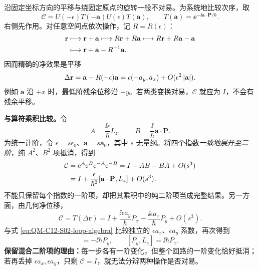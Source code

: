 

沿固定坐标方向的平移与绕固定原点的旋转一般不对易。为系统地比较次序，取
\begin{equation}
  \mathcal C=U(-\epsilon)T(-\mathbf a)U(\epsilon)T(\mathbf a),
  \qquad T(\mathbf a)=\ee^{-\ii\mathbf a\cdot\mathbf P/\hbar}.
\end{equation}
右侧先作用。对任意空间点依次操作，记 $R=R(\epsilon)$：
\begin{align}
  \mathbf r&\longmapsto\mathbf r+\mathbf a
  \longmapsto R\mathbf r+R\mathbf a
  \longmapsto R\mathbf r+R\mathbf a-\mathbf a\notag\\
  &\longmapsto\mathbf r+\mathbf a-R^{-1}\mathbf a.
\end{align}
因而精确的净效果是平移
\begin{equation}
  \Delta\mathbf r=\mathbf a-R(-\epsilon)\mathbf a
  =\epsilon(-a_y,a_x)+O(\epsilon^2\left|\mathbf a\right|).
  \label{eq:QM-C12-S02-loop-geometry}
\end{equation}
例如 $\mathbf a$ 沿 $+x$ 时，最低阶残余位移沿 $+y$。若两类变换对易，$\mathcal C$ 就应为 $I$，不会有残余平移。

\textbf{与算符乘积比较。}令
\begin{equation}
  A=\frac{\ii\epsilon}{\hbar}L_z,\qquad
  B=\frac{\ii}{\hbar}\mathbf a\cdot\mathbf P.
\end{equation}
为统一计阶，令 $\epsilon=s\epsilon_0$、$\mathbf a=s\mathbf a_0$，其中 $s$ 无量纲。将四个指数\emph{一致地展开至二阶}，纯 $A^2$、$B^2$ 项抵消，得到
\begin{align}
  \mathcal C&=\mathrm{e}^A\mathrm{e}^B\mathrm{e}^{-A}\mathrm{e}^{-B}
  =I+AB-BA+O(s^3)\notag\\
  &=I+\frac{\epsilon}{\hbar^2}[\mathbf a\cdot\mathbf P,L_z]+O(s^3).
  \label{eq:QM-C12-S02-loop-algebra}
\end{align}
不能只保留每个指数的一阶项，却把其乘积中的纯二阶项当成完整结果。另一方面，由几何净位移，
\begin{equation}
  \mathcal C=T(\Delta\mathbf r)
  =I+\frac{\ii\epsilon a_y}{\hbar}P_x
      -\frac{\ii\epsilon a_x}{\hbar}P_y+O(s^3).
\end{equation}
与式 \eqref{eq:QM-C12-S02-loop-algebra} 比较独立的 $\epsilon a_x$、$\epsilon a_y$ 系数，再次得到
\begin{equation}
  [P_x,L_z]=-\ii\hbar P_y,\qquad [P_y,L_z]=\ii\hbar P_x.
\end{equation}
\textbf{保留混合二阶项的理由：}每一步各有一阶变化，但整个回路的一阶变化恰好抵消；若再丢掉 $\epsilon a_x,\epsilon a_y$，只剩 $\mathcal C=I$，就无法分辨两种操作是否对易。

